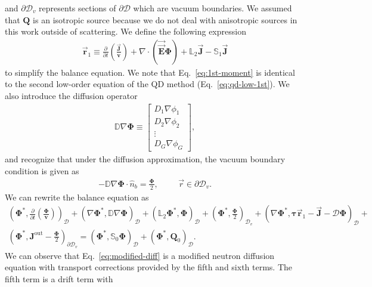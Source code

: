 %
and $\partial\mathcal{D}_v$ represents sections of $\partial\mathcal{D}$ which are vacuum boundaries. We
assumed that $\bm{Q}$ is an isotropic source because we do not deal with anisotropic sources in
this work outside of scattering.
We define the following expression
%
\begin{gather}
  \vec{\bm{r}}_1 \equiv \frac{\partial}{\partial t}\left(\frac{\vec{\bm{J}}}{\bm{v}}\right)
  + \nabla\cdot(\vec{\vec{\bm{E}}}\bm{\Phi}) + \mathbb{L}_2\vec{\bm{J}} -
  \mathbb{S}_1\vec{\bm{J}} \label{eq:1st-moment}
\end{gather}
%
to simplify the balance equation. We note that Eq.\ \ref{eq:1st-moment} is identical to the second
low-order equation of the \gls{QD} method (Eq.\ \ref{eq:qd-low-1st}).
We also introduce the diffusion operator
%
\begin{gather}
  \mathbb{D}\nabla\bm{\Phi} \equiv
  \begin{bmatrix}
    D_1\nabla\phi_1 \\
    D_2\nabla\phi_2 \\
    \vdots \\
    D_G\nabla\phi_G
  \end{bmatrix},
\end{gather}
%
and recognize that under the diffusion approximation, the vacuum boundary condition is given as
%
\begin{gather}
  -\mathbb{D}\nabla\bm{\Phi}\cdot\hat{n}_b = \frac{\bm{\Phi}}{2}, \hspace{1cm} \vec{r}\in\partial
  \mathcal{D}_v.
\end{gather}
%
We can rewrite the balance equation as
%
\begin{multline}
  \left(\bm{\Phi}^*,\frac{\partial}{\partial t}\left(\frac{\bm{\Phi}}{\bm{v}}\right)\right)_\mathcal{D}
  + \left(\nabla\bm{\Phi}^*, \mathbb{D}\nabla\bm{\Phi}\right)_\mathcal{D}
  + \left(\mathbb{L}_2\bm{\Phi}^*,\bm{\Phi}\right)_\mathcal{D}
  + \left(\bm{\Phi}^*,\frac{\bm{\Phi}}{2}\right)_{\mathcal{D}_v}
  + \left(\nabla\bm{\Phi}^*,\bm{\tau}\vec{\bm{r}}_1-\vec{\bm{J}}-\mathcal{D}\bm{\Phi}\right)_\mathcal{D}
  + \\
  \left(\bm{\Phi}^*,\bm{J}^\text{out}-\frac{\bm{\Phi}}{2}\right)_{\partial\mathcal{D}_v}
  = \left(\bm{\Phi}^*,\mathbb{S}_0\bm{\Phi}\right)_\mathcal{D}
  + \left(\bm{\Phi}^*,\bm{Q}_0\right)_\mathcal{D}. \label{eq:modified-diff}
\end{multline}
%
We can observe that Eq.\ \ref{eq:modified-diff} is a modified neutron diffusion equation with
transport corrections provided by the fifth and sixth terms. The fifth term is a drift term with
